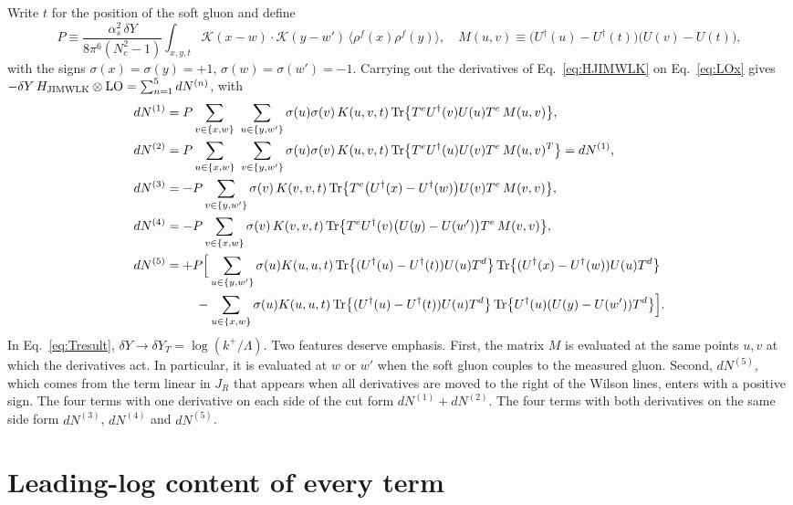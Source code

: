\documentclass[aps,prd,onecolumn,superscriptaddress,nofootinbib,floatfix,longbibliography,11pt]{revtex4-2}
\numberwithin{equation}{section}
\newcommand{\KK}{\mathcal{K}}
\newcommand{\Ud}{U^{\dagger}}
\newcommand{\Tr}{\mathrm{Tr}}
\begin{document}
Write $t$ for the position of the soft gluon and define
\begin{equation}
P\equiv\frac{\alpha_s^2\,\delta Y}{8\pi^6(N_c^2-1)}\int_{x,y,t}\KK(x-w)\cdot\KK(y-w')\,\langle\rho^f(x)\rho^f(y)\rangle,\quad M(u,v)\equiv\big(\Ud(u)-\Ud(t)\big)\big(U(v)-U(t)\big),
\end{equation}
with the signs $\sigma(x)=\sigma(y)=+1$, $\sigma(w)=\sigma(w')=-1$. Carrying out the derivatives of Eq.~\eqref{eq:HJIMWLK} on Eq.~\eqref{eq:LOx} gives $-\delta Y\,H_{\rm JIMWLK}\otimes{\rm LO}=\sum_{n=1}^5dN^{(n)}$, with
\begin{align}
dN^{(1)}&=P\sum_{v\in\{x,w\}}\ \sum_{u\in\{y,w'\}}\sigma(u)\sigma(v)\,K(u,v,t)\,\Tr\big\{T^e\Ud(v)U(u)T^e\,M(u,v)\big\},\\
dN^{(2)}&=P\sum_{u\in\{x,w\}}\ \sum_{v\in\{y,w'\}}\sigma(u)\sigma(v)\,K(u,v,t)\,\Tr\big\{T^e\Ud(u)U(v)T^e\,M(u,v)^T\big\}=dN^{(1)},\\
dN^{(3)}&=-P\sum_{v\in\{y,w'\}}\sigma(v)\,K(v,v,t)\,\Tr\big\{T^e\big(\Ud(x)-\Ud(w)\big)U(v)T^e\,M(v,v)\big\},\\
dN^{(4)}&=-P\sum_{v\in\{x,w\}}\sigma(v)\,K(v,v,t)\,\Tr\big\{T^e\Ud(v)\big(U(y)-U(w')\big)T^e\,M(v,v)\big\},\\
dN^{(5)}&=+P\Big[\sum_{u\in\{y,w'\}}\sigma(u)K(u,u,t)\,\Tr\big\{(\Ud(u)-\Ud(t))U(u)T^d\big\}\,\Tr\big\{(\Ud(x)-\Ud(w))U(u)T^d\big\}\notag\\
&\qquad\ -\sum_{u\in\{x,w\}}\sigma(u)K(u,u,t)\,\Tr\big\{(\Ud(u)-\Ud(t))U(u)T^d\big\}\,\Tr\big\{\Ud(u)(U(y)-U(w'))T^d\big\}\Big].
\end{align}
In Eq.~\eqref{eq:Tresult}, $\delta Y\to\delta Y_T=\log(k^+/\Lambda)$. Two features deserve emphasis. First, the matrix $M$ is evaluated at the same points $u,v$ at which the derivatives act. In particular, it is evaluated at $w$ or $w'$ when the soft gluon couples to the measured gluon. Second, $dN^{(5)}$, which comes from the term linear in $J_R$ that appears when all derivatives are moved to the right of the Wilson lines, enters with a positive sign. The four terms with one derivative on each side of the cut form $dN^{(1)}+dN^{(2)}$. The four terms with both derivatives on the same side form $dN^{(3)}$, $dN^{(4)}$ and $dN^{(5)}$.
\section{Leading-log content of every term}\label{app:LLrows}
\end{document}
